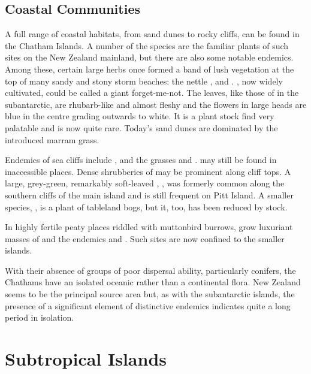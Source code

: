 \subsection{Coastal Communities}

A full range of coastal habitats, from sand dunes to rocky cliffs, can be found in the Chatham Islands.
A number of the species are the familiar plants of such sites on the New Zealand mainland, but there are also some notable endemics.
Among these, certain large herbs once formed a band of lush vegetation at the top of many sandy and stony storm beaches: the nettle ,  and . , now widely cultivated, could be called a giant forget-me-not.
The leaves, like those of  in the subantarctic, are rhubarb-like and almost fleshy and the flowers in large heads are blue in the centre grading outwards to white.
It is a plant stock find very palatable and is now quite rare.
Today's sand dunes are dominated by the introduced marram grass.

Endemics of sea cliffs include ,  and the grasses  and .  may still be found in inaccessible places.
Dense shrubberies of  may be prominent along cliff tops.
A large, grey-green, remarkably soft-leaved , , was formerly common along the southern cliffs of the main island and is still frequent on Pitt Island.
A smaller species, , is a plant of tableland bogs, but it, too, has been reduced by stock.

In highly fertile peaty places riddled with muttonbird burrows, grow luxuriant masses of  and the endemics  and .
Such sites are now confined to the smaller islands.

With their absence of groups of poor dispersal ability, particularly conifers, the Chathams have an isolated oceanic rather than a continental flora.
New Zealand seems to be the principal source area but, as with the subantarctic islands, the presence of a significant element of distinctive endemics indicates quite a long period in isolation.

\section{Subtropical Islands}

